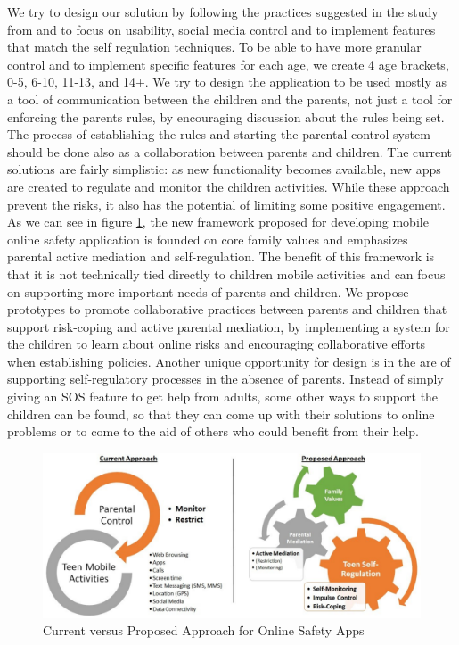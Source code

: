 We try to design our solution by following the practices suggested in the study from \parencite{wisniewski2017parental} and to focus on usability, social media control and to implement features that match the self regulation techniques. To be able to have more granular control and to implement specific features for each age, we create 4 age brackets, 0-5, 6-10, 11-13, and 14+. We try to design the application to be used mostly as a tool of communication between the children and the parents, not just a tool for enforcing the parents rules, by encouraging discussion about the rules being set. The process of establishing the rules and starting the parental control system should be done also as a collaboration between parents and children. The current solutions are fairly simplistic: as new functionality becomes available, new apps are created to regulate and monitor the children activities. While these approach prevent the risks, it also has the potential of limiting some positive engagement. As we can see in figure \ref{fig:current-vs-proposed}, the new framework proposed for developing mobile online safety application is founded on core family values and emphasizes parental active mediation and self-regulation. The benefit of this framework is that it is not technically tied directly to children mobile activities and can focus on supporting more important needs of parents and children. We propose prototypes to promote collaborative practices between parents and children that support risk-coping and active parental mediation, by implementing a system for the children to learn about online risks and encouraging collaborative efforts when establishing policies. Another unique opportunity for design is in the are of supporting self-regulatory processes in the absence of parents. Instead of simply giving an SOS feature to get help from adults, some other ways to support the children can be found, so that they can come up with their solutions to online problems or to come to the aid of others who could benefit from their help.

\begin{figure}[th]
\centering
\includegraphics[width=1\textwidth]{Figures/current-vs-proposed}
\decoRule
\caption{Current versus Proposed Approach for Online Safety Apps}
\label{fig:current-vs-proposed}
\end{figure}

